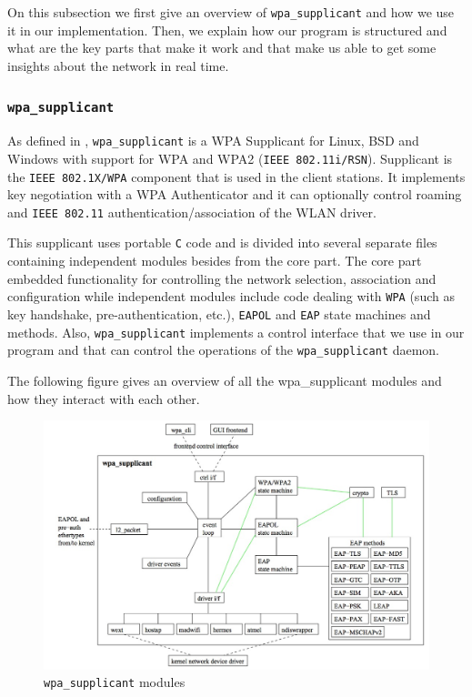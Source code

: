 On this subsection we first give an overview of \texttt{wpa\_supplicant} and how we use it in our implementation. Then, we explain how our program is structured and what are the key parts that make it work and that make us able to get some insights about the network in real time.

\subsubsection{\texttt{wpa\_supplicant}} %
 As defined in \cite{wpa-supplicant}, \texttt{wpa\_supplicant} is a WPA Supplicant for Linux, BSD and Windows with support for WPA and WPA2 (\texttt{IEEE 802.11i/RSN}). Supplicant is the \texttt{IEEE 802.1X/WPA} component that is used in the client stations. It implements key negotiation with a WPA Authenticator and it can optionally control roaming and \texttt{IEEE 802.11} authentication/association of the WLAN driver.

 This supplicant uses portable \texttt{C} code and is divided into several separate files containing independent modules besides from the core part. The core part embedded functionality for controlling the network selection, association and configuration while independent modules include code dealing with \texttt{WPA} (such as key handshake, pre-authentication, etc.), \texttt{EAPOL} and \texttt{EAP} state machines and methods. Also, \texttt{wpa\_supplicant} implements a control interface that we use in our program and that can control the operations of the \texttt{wpa\_supplicant} daemon.

The following figure gives an overview of all the wpa\_supplicant modules and how they interact with each other.

 \begin{figure}[H]
 	\begin{center}
		\includegraphics[width=1\linewidth]{Pictures/chapter4/wpa-supplicant-modules.jpg}
		\caption{\texttt{wpa\_supplicant} modules}
	\end{center}
\end{figure}


